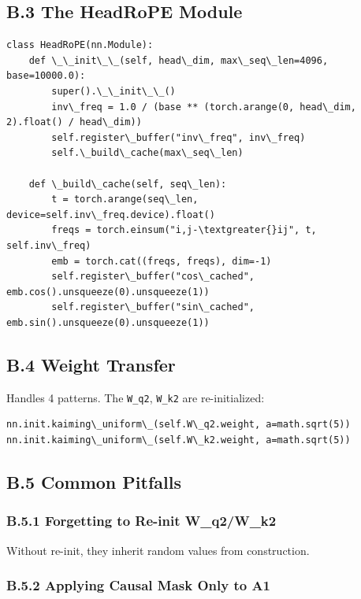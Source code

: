 \subsection{B.3 The HeadRoPE Module}

\begin{lstlisting}
class HeadRoPE(nn.Module):
    def \_\_init\_\_(self, head\_dim, max\_seq\_len=4096, base=10000.0):
        super().\_\_init\_\_()
        inv\_freq = 1.0 / (base ** (torch.arange(0, head\_dim, 2).float() / head\_dim))
        self.register\_buffer("inv\_freq", inv\_freq)
        self.\_build\_cache(max\_seq\_len)
    
    def \_build\_cache(self, seq\_len):
        t = torch.arange(seq\_len, device=self.inv\_freq.device).float()
        freqs = torch.einsum("i,j-\textgreater{}ij", t, self.inv\_freq)
        emb = torch.cat((freqs, freqs), dim=-1)
        self.register\_buffer("cos\_cached", emb.cos().unsqueeze(0).unsqueeze(1))
        self.register\_buffer("sin\_cached", emb.sin().unsqueeze(0).unsqueeze(1))
\end{lstlisting}

\subsection{B.4 Weight Transfer}

Handles 4 patterns. The \texttt{W\_q2}, \texttt{W\_k2} are re-initialized:

\begin{lstlisting}
nn.init.kaiming\_uniform\_(self.W\_q2.weight, a=math.sqrt(5))
nn.init.kaiming\_uniform\_(self.W\_k2.weight, a=math.sqrt(5))
\end{lstlisting}

\subsection{B.5 Common Pitfalls}

\subsubsection{B.5.1 Forgetting to Re-init W\_q2/W\_k2}

Without re-init, they inherit random values from construction.

\subsubsection{B.5.2 Applying Causal Mask Only to A1}


